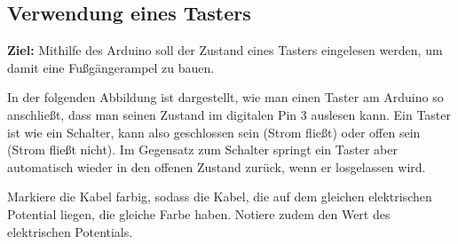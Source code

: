 \documentclass[ngerman, 11pt]{scrreprt}
\begin{document}
	\setcounter{page}{16}
	\setcounter{chapter}{3}
	\setcounter{section}{6}
	\setcounter{subsection}{1}
	\subsection{Verwendung eines Tasters}
	
	\begin{ziel}
		\textbf{Ziel:} 	Mithilfe des Arduino soll der Zustand eines Tasters eingelesen werden, um damit eine Fußgängerampel zu bauen.
	\end{ziel}
	
	In der folgenden Abbildung ist dargestellt, wie man einen Taster am Arduino so anschließt, dass man seinen Zustand im digitalen Pin 3 auslesen kann. Ein Taster ist wie ein Schalter, kann also geschlossen sein (Strom fließt) oder offen sein (Strom fließt nicht). Im Gegensatz zum Schalter springt ein Taster aber automatisch wieder in den offenen Zustand zurück, wenn er losgelassen wird.
	
	\begin{aufgabe*}
		Markiere die Kabel farbig, sodass die Kabel, die auf dem gleichen elektrischen Potential liegen, die gleiche Farbe haben. Notiere zudem den Wert des elektrischen Potentials.
	\end{aufgabe*}
	
\end{document}
